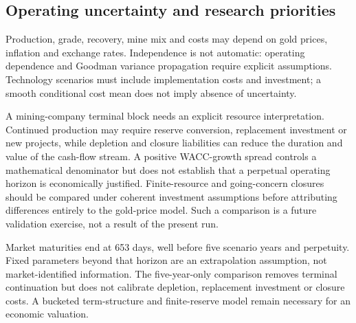\subsection{Operating uncertainty and research priorities}
Production, grade, recovery, mine mix and costs may depend on gold prices, inflation and exchange rates. Independence is not automatic: operating dependence and Goodman variance propagation require explicit assumptions. Technology scenarios must include implementation costs and investment; a smooth conditional cost mean does not imply absence of uncertainty.

A mining-company terminal block needs an explicit resource interpretation. Continued production may require reserve conversion, replacement investment or new projects, while depletion and closure liabilities can reduce the duration and value of the cash-flow stream. A positive WACC-growth spread controls a mathematical denominator but does not establish that a perpetual operating horizon is economically justified. Finite-resource and going-concern closures should be compared under coherent investment assumptions before attributing differences entirely to the gold-price model. Such a comparison is a future validation exercise, not a result of the present run.

Market maturities end at 653 days, well before five scenario years and perpetuity. Fixed parameters beyond that horizon are an extrapolation assumption, not market-identified information. The five-year-only comparison removes terminal continuation but does not calibrate depletion, replacement investment or closure costs. A bucketed term-structure and finite-reserve model remain necessary for an economic valuation.



\begingroup
\setlength{\bibsep}{0.6pt}
\fontsize{6.75}{7.75}\selectfont

\endgroup
